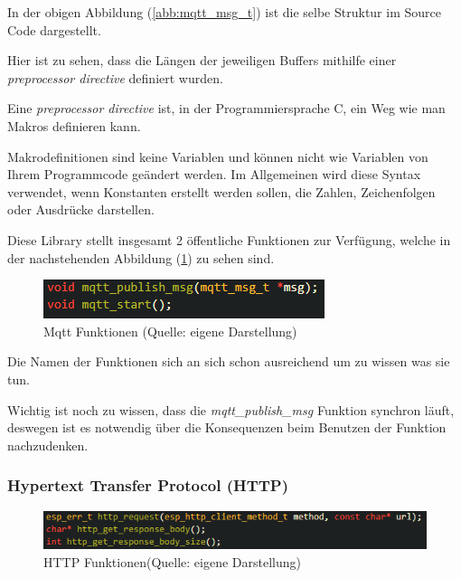 In der obigen Abbildung (\ref{abb:mqtt_msg_t}) ist die selbe Struktur im Source Code dargestellt.

Hier ist zu sehen, dass die Längen der jeweiligen Buffers mithilfe einer \textit{preprocessor directive} definiert wurden. 

Eine \textit{preprocessor directive} ist, in der Programmiersprache C, ein Weg wie man Makros definieren kann. 

Makrodefinitionen sind keine Variablen und können nicht wie Variablen von Ihrem Programmcode geändert werden. Im Allgemeinen wird diese Syntax verwendet, wenn Konstanten erstellt werden sollen, die Zahlen, Zeichenfolgen oder Ausdrücke darstellen.

Diese Library stellt insgesamt 2 öffentliche Funktionen zur Verfügung, welche in der nachstehenden Abbildung (\ref{abb:mqtt_functions}) zu sehen sind.

\begin{figure}[H]
    \begin{center}
        \includegraphics[scale=1]{images/mqtt_functions.png}
        \caption{Mqtt Funktionen (Quelle: eigene Darstellung)}
        \label{abb:mqtt_functions}
    \end{center}
\end{figure}

Die Namen der Funktionen sich an sich schon ausreichend um zu wissen was sie tun.

Wichtig ist noch zu wissen, dass die \textit{mqtt\_publish\_msg} Funktion synchron läuft, deswegen ist es notwendig über die Konsequenzen beim Benutzen der Funktion nachzudenken.

\subsubsection{Hypertext Transfer Protocol (HTTP)}\label{sec:own-libraries-http}

\begin{figure}[H]
    \begin{center}
        \includegraphics[scale=1]{images/http_functions.png}
        \caption{HTTP Funktionen(Quelle: eigene Darstellung)}
        \label{abb:http_functions}
    \end{center}    
\end{figure}

